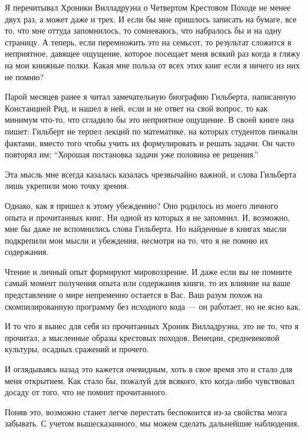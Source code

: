 \documentclass[ebook,12pt,oneside,openany]{memoir}
\begin{document}
\maketitle

Я перечитывал Хроники Вилладруэна о Четвертом Крестовом Походе не
менее двух раз, а может даже и трех. И если бы мне пришлось записать
на бумаге, все то, что мне оттуда запомнилось, то сомневаюсь, что
набралось бы и на одну страницу. А теперь, если перемножить это на
семьсот, то результат сложится в неприятное, давящее ощущение, которое
посещает меня всякий раз когда я гляжу на мои книжные полки. Какая мне
польза от всех этих книг если я ничего из них не помню?

Парой месяцев ранее я читал замечательную биографию Гильберта,
написанную Констанцией Рид, и нашел в ней, если и не ответ на свой
вопрос, то как минимум что-то, что сгладило бы это неприятное
ощущение. В своей книге она пишет: Гильберт не терпел лекций по
математике, на которых студентов пичкали фактами, вместо того чтобы
учить их формулировать и решать задачи. Он часто повторял им: “Хорошая
постановка задачи уже половина ее решения.”

Эта мысль мне всегда казалась казалась чрезвычайно важной, и слова
Гильберта лишь укрепили мою точку зрения.

Однако, как я пришел к этому убеждению? Оно родилось из моего личного
опыта и прочитанных книг. Ни одной из которых я не запомнил. И,
возможно, мне бы даже не вспомнились слова Гильберта. Но найденные в
книгах мысли подкрепили мои мысли и убеждения, несмотря на то, что я
не помню их содержания.


Чтение и личный опыт формируют мировоззрение. И даже если вы не
помните самый момент получения опыта или содержания книги, то их
влияние на ваше представление о мире непременно остается в Вас. Ваш
разум похож на скомпилированную программу без исходного кода — он
работает, но не ясно как.

И то что я вынес для себя из прочитанных Хроник Вилладруэна, это не
то, что я прочитал, а мысленные образы крестовых походов, Венеции,
средневековой культуры, осадных сражений и прочего.

И оглядываясь назад это кажется очевидным, хоть в свое время это и
стало для меня открытием. Как стало бы, пожалуй для всякого, кто
когда-либо чувствовал досаду от того, что не помнит прочитанного.

Поняв это, возможно станет легче перестать беспокоится из-за свойства
мозга забывать. С учетом вышесказанного, мы можем сделать дальнейшие
наблюдения.
\end{document}
